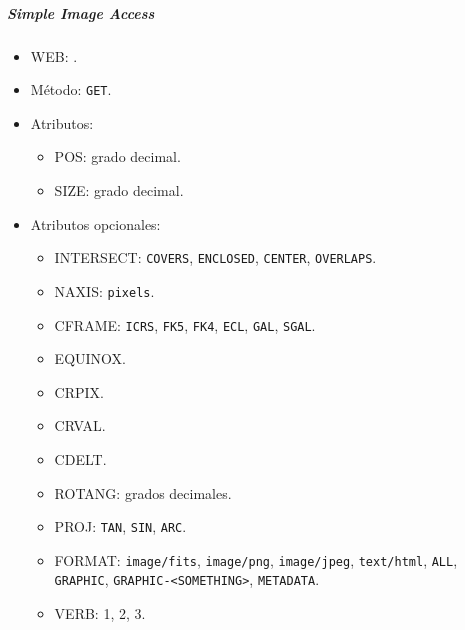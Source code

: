 \subparagraph{Simple Image Access}

\begin{itemize}
	\item WEB: \url{}.
	\item M\'etodo: \verb;GET;.
	\item Atributos: 
		\begin{itemize}
			\item POS: grado decimal.
			\item SIZE: grado decimal.
		\end{itemize}
	\item Atributos opcionales:
		\begin{itemize}
			\item INTERSECT: \verb;COVERS;, \verb;ENCLOSED;, \verb;CENTER;, \verb;OVERLAPS;.
			\item NAXIS: \verb;pixels;.
			\item CFRAME: \verb;ICRS;, \verb;FK5;, \verb;FK4;, \verb;ECL;, \verb;GAL;, \verb;SGAL;.
			\item EQUINOX.
			\item CRPIX.
			\item CRVAL.
			\item CDELT.
			\item ROTANG: grados decimales.
			\item PROJ: \verb;TAN;, \verb;SIN;, \verb;ARC;.
			\item FORMAT: \verb;image/fits;, \verb;image/png;, \verb;image/jpeg;, \verb;text/html;, \verb;ALL;, \verb;GRAPHIC;, \verb;GRAPHIC-<SOMETHING>;, \verb;METADATA;.
			\item VERB: 1, 2, 3.
		\end{itemize}
\end{itemize}
